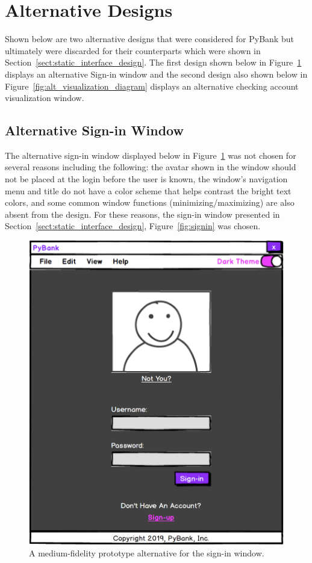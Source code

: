 \section{Alternative Designs}
\label{sect:alternative_designs}

Shown below are two alternative designs that were considered for PyBank but ultimately were discarded for their counterparts which were shown in Section~\ref{sect:static_interface_design}. The first design shown below in Figure~\ref{fig:alt_sign_in_diagram} displays an alternative Sign-in window and the second design also shown below in Figure~\ref{fig:alt_visualization_diagram} displays an alternative checking account visualization window.

\subsection{Alternative Sign-in Window}
\label{sect:alt_sign_in}

The alternative sign-in window displayed below in Figure~\ref{fig:alt_sign_in_diagram} was not chosen for several reasons including the following: the avatar shown in the window should not be placed at the login before the user is known, the window's navigation menu and title do not have a color scheme that helps contrast the bright text colors, and some common window functions (minimizing/maximizing) are also absent from the design. For these reasons, the sign-in window presented in Section~\ref{sect:static_interface_design}, Figure~\ref{fig:signin} was chosen. 

\begin{figure}[H]
	\begin{centering}
	\includegraphics[width=0.55\linewidth, height=0.70\linewidth]{figures/alternative_sign_in_design.png}
	\caption{A medium-fidelity prototype alternative for the sign-in window.}
	\label{fig:alt_sign_in_diagram}
	\end{centering}
\end{figure}

